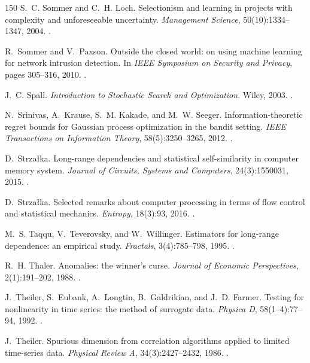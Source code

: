 \begin{thebibliography}{150}
S.~C. Sommer and C.~H. Loch. Selectionism and learning in projects with complexity and unforeseeable uncertainty. \emph{Management Science}, 50(10):1334--1347, 2004. .

R.~Sommer and V.~Paxson. Outside the closed world: on using machine learning for network intrusion detection. In \emph{IEEE Symposium on Security and Privacy}, pages 305--316, 2010. .

J.~C. Spall. \emph{Introduction to Stochastic Search and Optimization}. Wiley, 2003. .

N.~Srinivas, A.~Krause, S.~M. Kakade, and M.~W. Seeger. Information-theoretic regret bounds for Gaussian process optimization in the bandit setting. \emph{IEEE Transactions on Information Theory}, 58(5):3250--3265, 2012. .

D.~Strza{\l}ka. Long-range dependencies and statistical self-similarity in computer memory system. \emph{Journal of Circuits, Systems and Computers}, 24(3):1550031, 2015. .

D.~Strza{\l}ka. Selected remarks about computer processing in terms of flow control and statistical mechanics. \emph{Entropy}, 18(3):93, 2016. .

M.~S. Taqqu, V.~Teverovsky, and W.~Willinger. Estimators for long-range dependence: an empirical study. \emph{Fractals}, 3(4):785--798, 1995. .

R.~H. Thaler. Anomalies: the winner's curse. \emph{Journal of Economic Perspectives}, 2(1):191--202, 1988. .

J.~Theiler, S.~Eubank, A.~Longtin, B.~Galdrikian, and J.~D. Farmer. Testing for nonlinearity in time series: the method of surrogate data. \emph{Physica D}, 58(1--4):77--94, 1992. .

J.~Theiler. Spurious dimension from correlation algorithms applied to limited time-series data. \emph{Physical Review A}, 34(3):2427--2432, 1986. .


\end{thebibliography}
